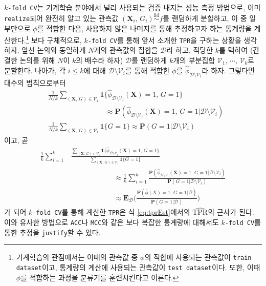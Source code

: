 \documentclass[11pt,onecolumn,twoside,a4size]{gsag3jnl}
\newcommand{\iid}{\stackrel{\mathrm{iid}}{\sim}}
\begin{document}
\texttt{$k$-fold CV}는 기계학습 분야에서 널리 사용되는 검증 내지는 성능 측정 방법으로, 이미 \texttt{realize}되어 완전히 알고 있는 관측값 $(\mathbf{X}_i,\,G_i)\iid f$를 랜덤하게 분할하고, 이 중 일부만으로 $\phi$를 적합한 다음, 사용하지 않은 나머지를 통해 추정하고자 하는 통계량을 계산한다.\footnote{기계학습의 관점에서는 이때의 관측값 중 $\phi$의 적합에 사용되는 관측값이 \texttt{train dataset}이고, 통계량의 계산에 사용되는 관측값이 \texttt{test dataset}이다. 또한, 이때 $\phi$를 적합하는 과정을 분류기를 훈련시킨다고 이른다.} 보다 구체적으로, \texttt{$k$-fold CV}를 통해 앞서 소개한 \texttt{TPR}을 구하는 상황을 생각하자. 앞선 논의와 동일하게 $N$개의 관측값의 집합을 $\mathcal{D}$라 하고, 적당한 $k$를 택하여 (간결한 논의를 위해 $N$이 $k$의 배수라 하자) $\mathcal{D}$를 랜덤하게 $k$개의 부분집합 $\mathcal{V}_1,\,\cdots,\,\mathcal{V}_k$로 분할한다. 나아가, 각 $i\leq k$에 대해 $\mathcal{D}\setminus\mathcal{V}_i$를 통해 적합한 $\phi$를 $\widehat{\phi}_{\mathcal{D}\setminus\mathcal{V}_i}$라 하자. 그렇다면 대수의 법칙으로부터
\begin{align}
  &\frac{1}{N/k}\sum_{(\mathbf{X},\,G)\in\mathcal{V}_i}\mathbf{1}\{\widehat{\phi}_{\mathcal{D}\setminus\mathcal{V}_i}(\mathbf{X})=1,\,G=1\}\\
  &\qquad\qquad\qquad\qquad\approx\mathbf{P}(\widehat{\phi}_{\mathcal{D}\setminus\mathcal{V}_i}(\mathbf{X})=1,\,G=1\vert\mathcal{D}\setminus\mathcal{V}_i)\nonumber\\
  &\frac{1}{N/k}\sum_{(\mathbf{X},\,G)\in\mathcal{V}_i}\mathbf{1}\{G=1\}\approx\mathbf{P}(G=1\vert\mathcal{D}\setminus\mathcal{V}_i)
\end{align}
이고, 곧
\begin{align}
  \frac{1}{k}\sum_{i=1}^k&\frac{\sum_{(\mathbf{X},\,G)\in\mathcal{V}_i}\mathbf{1}\{\widehat{\phi}_{\mathcal{D}\setminus\mathcal{V}_i}(\mathbf{X})=1,\,G=1\}}{\sum_{(\mathbf{X},\,G)\in\mathcal{V}_i}\mathbf{1}\{G=1\}}\\
  &\qquad\qquad\qquad\approx\frac{1}{k}\sum_{i=1}^k\frac{\mathbf{P}(\widehat{\phi}_{\mathcal{D}\setminus\mathcal{V}_i}(\mathbf{X})=1,\,G=1\vert\mathcal{D}\setminus\mathcal{V}_i)}{\mathbf{P}(G=1\vert\mathcal{D}\setminus\mathcal{V}_i)}\nonumber\\
  &\qquad\qquad\qquad\approx\mathbf{E}_\mathcal{D}\bigg(\frac{\mathbf{P}(\widehat{\phi}(X)=1,\,G=1\vert\mathcal{D})}{\mathbf{P}(G=1\vert\mathcal{D})}\bigg)\nonumber
\end{align}
가 되어 \texttt{$k$-fold CV}를 통해 계산한 \texttt{TPR}은 식 \ref{eq:tprEst}에서의 $\widehat{\mathrm{TPR}}$의 근사가 된다. 이와 유사한 방법으로 \texttt{ACC}나 \texttt{MCC}와 같은 보다 복잡한 통계량에 대해서도 \texttt{$k$-fold CV}를 통한 추정을 \texttt{justify}할 수 있다.
\end{document}
